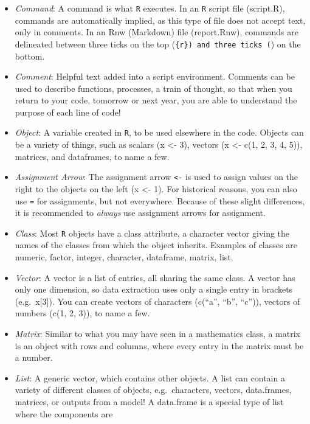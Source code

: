 \documentclass[]{article}
\begin{document}
\begin{itemize}
\item
  \emph{Command}: A command is what \texttt{R} executes. In an
  \texttt{R} script file (script.R), commands are automatically implied,
  as this type of file does not accept text, only in comments. In an Rnw
  (Markdown) file (report.Rnw), commands are delineated between three
  ticks on the top (\texttt{\{r\})\ and\ three\ ticks\ (}) on the
  bottom.
\item
  \emph{Comment}: Helpful text added into a script environment. Comments
  can be used to describe functions, processes, a train of thought, so
  that when you return to your code, tomorrow or next year, you are able
  to understand the purpose of each line of code!
\item
  \emph{Object}: A variable created in \texttt{R}, to be used elsewhere
  in the code. Objects can be a variety of things, such as scalars (x
  \textless{}- 3), vectors (x \textless{}- c(1, 2, 3, 4, 5)), matrices,
  and dataframes, to name a few.
\item
  \emph{Assignment Arrow}: The assignment arrow \texttt{\textless{}-} is
  used to assign values on the right to the objects on the left (x
  \textless{}- 1). For historical reasons, you can also use \texttt{=}
  for assignments, but not everywhere. Because of these slight
  differences, it is recommended to \emph{always} use assignment arrows
  for assignment.
\item
  \emph{Class}: Most \texttt{R} objects have a class attribute, a
  character vector giving the names of the classes from which the object
  inherits. Examples of classes are numeric, factor, integer, character,
  dataframe, matrix, list.
\item
  \emph{Vector}: A vector is a list of entries, all sharing the same
  class. A vector has only one dimension, so data extraction uses only a
  single entry in brackets (e.g.~x{[}3{]}). You can create vectors of
  characters (c(``a'', ``b'', ``c'')), vectors of numbers (c(1, 2, 3)),
  to name a few.
\item
  \emph{Matrix}: Similar to what you may have seen in a mathematics
  class, a matrix is an object with rows and columns, where every entry
  in the matrix must be a number.
\item
  \emph{List}: A generic vector, which contains other objects. A list
  can contain a variety of different classes of objects,
  e.g.~characters, vectors, data.frames, matrices, or outputs from a
  model! A data.frame is a special type of list where the components are

\end{itemize}
\end{document}
